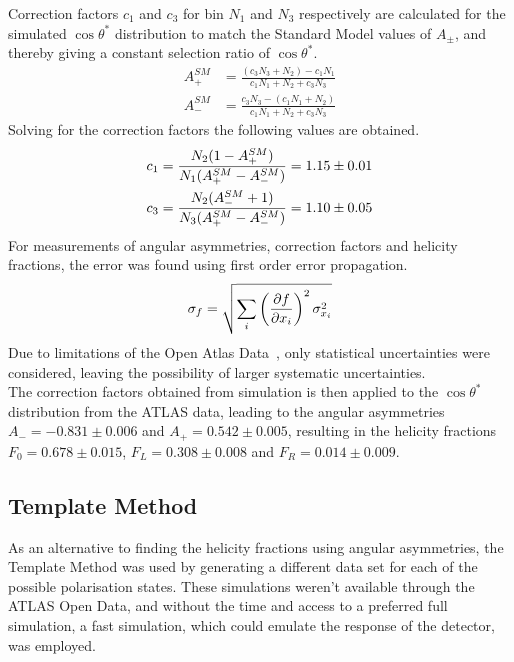 \documentclass[12pt,a4paper]{article}
\numberwithin{equation}{section}
\begin{document}
Correction factors $c_1$ and $c_3$ for bin $N_1$ and $N_3$ respectively are
calculated for the simulated $\cos\theta^*$ distribution to match the Standard Model
values of $A_{\pm}$, and thereby giving a constant selection ratio of $\cos\theta^*$.
\begin{align}
	A_{+}^{SM} &= \frac{(c_3N_3 + N_2) - c_1N_1}{c_1N_1 + N_2 + c_3N_3} \\
	A_{-}^{SM} &= \frac{c_3N_3 - (c_1N_1 + N_2)}{c_1N_1 + N_2 + c_3N_3}
\end{align}
Solving for the correction factors the following values are obtained.
\begin{align} \label{eq:correction}
	c_1 &= \frac{N_2(1-A_{+}^{SM})}{N_1(A_{+}^{SM} -A_{-}^{SM})} = \num{1.15 +- 0.01}  \\
	c_3 &= \frac{N_2(A_{-}^{SM}+1)}{N_3(A_{+}^{SM}-A_{-}^{SM})} = \num{1.10 +- 0.05}
\end{align}
For measurements of angular asymmetries, correction factors and helicity
fractions, the error was found using first order error propagation.
\begin{align}
	\sigma_{f} = \sqrt{\sum_{i}\left(\pdv{f}{x_i}\right)^2\sigma_{x_i}^2}
\end{align}
Due to limitations of the Open Atlas Data~\cite{oreach2020}, only statistical
uncertainties were considered, leaving the possibility of larger systematic
uncertainties.\\

The correction factors obtained from simulation is then applied to the
$\cos\theta^{*}$ distribution from the ATLAS data, leading to the angular asymmetries
$A_- = -0.831 \pm 0.006$ and $A_+ = 0.542 \pm 0.005$, resulting in the helicity
fractions $F_0=0.678 \pm 0.015$, $F_L=0.308 \pm 0.008$ and $F_R=0.014 \pm 0.009$.

\subsection{Template Method}
As an alternative to finding the helicity fractions using angular asymmetries,
the Template Method was used by generating a different data set for each of the
possible polarisation states. These simulations weren't available through the
ATLAS Open Data, and without the time and access to a preferred full simulation,
a fast simulation, which could emulate the response of the detector,
was employed.\\
\end{document}
